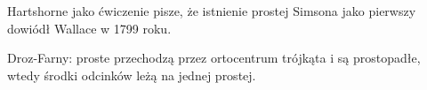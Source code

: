 Hartshorne jako ćwiczenie \cite[s. 61]{hartshorne2000} pisze, że istnienie prostej Simsona jako pierwszy dowiódł Wallace w 1799 roku.

Droz-Farny: proste przechodzą przez ortocentrum trójkąta i są prostopadłe, wtedy środki odcinków leżą na jednej prostej. %

%





